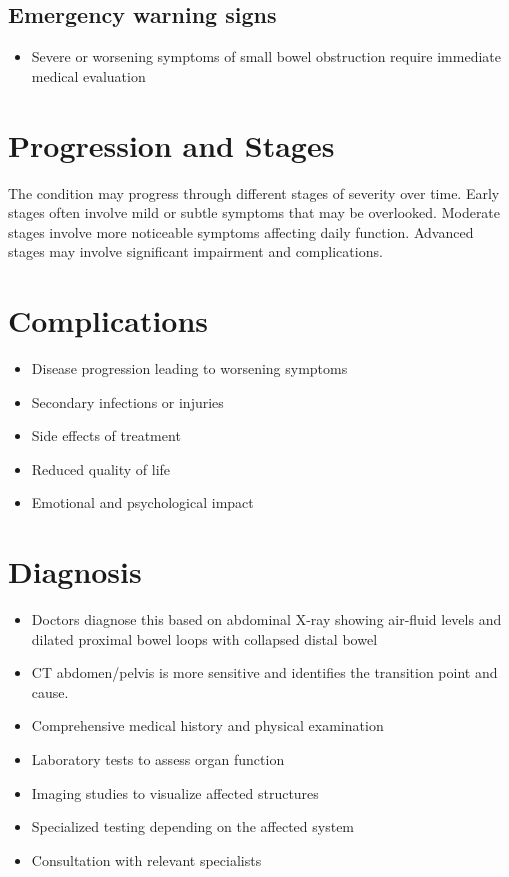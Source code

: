 \subsection{Emergency warning signs}
\begin{itemize}[noitemsep]
  \item Severe or worsening symptoms of small bowel obstruction require immediate medical evaluation
\end{itemize}
\section{Progression and Stages}
The condition may progress through different stages of severity over time. Early stages often involve mild or subtle symptoms that may be overlooked. Moderate stages involve more noticeable symptoms affecting daily function. Advanced stages may involve significant impairment and complications.
\section{Complications}
\begin{itemize}[noitemsep]
  \item Disease progression leading to worsening symptoms
  \item Secondary infections or injuries
  \item Side effects of treatment
  \item Reduced quality of life
  \item Emotional and psychological impact
\end{itemize}
\section{Diagnosis}
\begin{itemize}[noitemsep]
  \item Doctors diagnose this based on abdominal X-ray showing air-fluid levels and dilated proximal bowel loops with collapsed distal bowel
  \item CT abdomen/pelvis is more sensitive and identifies the transition point and cause.
  \item Comprehensive medical history and physical examination
  \item Laboratory tests to assess organ function
  \item Imaging studies to visualize affected structures
  \item Specialized testing depending on the affected system
  \item Consultation with relevant specialists
\end{itemize}
